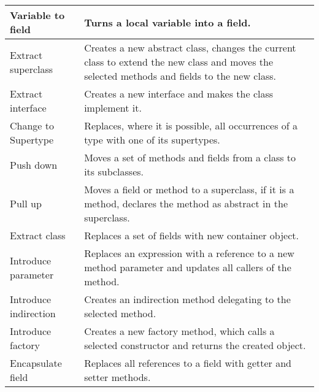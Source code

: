 \begin{table}[htbp]
\begin{tabular}{ p{2.95cm}| p{9.15cm}}
Variable to field         & Turns a local variable into a field.                                                                                                                                       \\ \hline
Extract superclass        & Creates a new abstract class, changes the current class to extend the new class and moves the selected methods and fields to the new class.                               \\ \hline
Extract interface         & Creates a new interface and makes the class implement it.                                                                                                                 \\ \hline
Change to Supertype       & Replaces, where it is possible, all occurrences of a type with one of its supertypes.                                                                                     \\ \hline
Push down                 & Moves a set of methods and fields from a class to its subclasses.                                                                                                         \\ \hline
Pull up                   & Moves a field or method to a superclass, if it is a method, declares the method as abstract in the superclass.                                                            \\ \hline
Extract class             & Replaces a set of fields with new container object.                                                                                                                       \\ \hline
Introduce parameter       & Replaces an expression with a reference to a new method parameter and updates all callers of the method.                                                                  \\ \hline
Introduce indirection     & Creates an indirection method delegating to the selected method.                                                                                                          \\ \hline
Introduce factory         & Creates a new factory method, which calls a selected constructor and returns the created object.                                                                          \\ \hline
Encapsulate field         & Replaces all references to a field with getter and setter methods.                                                                                                        \\ \hline

\end{tabular}
\end{table}
